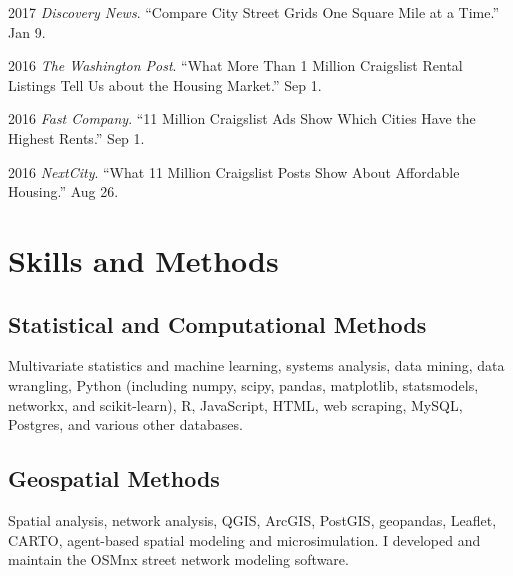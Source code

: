 \documentclass[12pt,letterpaper]{report}
\newcommand{\listitemspace}{0.15em}
\renewenvironment{itemize}
{\begin{list}{}{\setlength{\leftmargin}{0em}
				\setlength{\parskip}{0em}
				\setlength{\itemsep}{\listitemspace}
				\setlength{\parsep}{\listitemspace}}}
{\end{list}}
\begin{document}
\begin{tablist}
\item 2017 \tab \textit{Discovery News}. \enquote{Compare City Street Grids One Square Mile at a Time.} Jan 9.

\item 2016 \tab \textit{The Washington Post}. \enquote{What More Than 1 Million Craigslist Rental Listings Tell Us about the Housing Market.} Sep 1.

\item 2016 \tab \textit{Fast Company}. \enquote{11 Million Craigslist Ads Show Which Cities Have the Highest Rents.} Sep 1.

\item 2016 \tab \textit{NextCity}. \enquote{What 11 Million Craigslist Posts Show About Affordable Housing.} Aug 26.

\end{tablist}



\section*{Skills and Methods}

\subsection*{Statistical and Computational Methods}

\begin{itemize}
	
\item Multivariate statistics and machine learning, systems analysis, data mining, data wrangling, Python (including numpy, scipy, pandas, matplotlib, statsmodels, networkx, and scikit-learn), R, JavaScript, HTML, web scraping, MySQL, Postgres, and various other databases.

\end{itemize}

\subsection*{Geospatial Methods}

\begin{itemize}

\item Spatial analysis, network analysis, QGIS, ArcGIS, PostGIS, geopandas, Leaflet, CARTO, agent-based spatial modeling and microsimulation. I developed and maintain the OSMnx street network modeling software.

\end{itemize}
\end{document}
